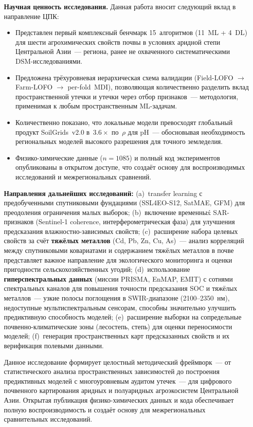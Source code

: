 \textbf{Научная ценность исследования.}
Данная работа вносит следующий вклад в направление ЦПК:
\begin{itemize}[nosep]
  \item Представлен первый комплексный бенчмарк 15~алгоритмов (11~ML + 4~DL) для шести агрохимических свойств почвы в условиях аридной степи Центральной Азии~--- региона, ранее не охваченного систематическими DSM-исследованиями.
  \item Предложена трёхуровневая иерархическая схема валидации (Field-LOFO $\to$ Farm-LOFO $\to$ per-fold~MDI), позволяющая количественно разделить вклад пространственной утечки и утечки через отбор признаков~--- методология, применимая к любым пространственным ML-задачам.
  \item Количественно показано, что локальные модели превосходят глобальный продукт SoilGrids~v2.0 в~$3.6\times$ по~$\rho$ для pH~--- обосновывая необходимость региональных моделей высокого разрешения для точного земледелия.
  \item Физико-химические данные ($n = 1085$) и полный код экспериментов опубликованы в открытом доступе, что создаёт основу для воспроизводимых исследований и межрегиональных сравнений.
\end{itemize}

\textbf{Направления дальнейших исследований:}
(a)~transfer learning с предобученными спутниковыми фундациями (SSL4EO-S12, SatMAE, GFM) для преодоления ограничения малых выборок;
(b)~включение временны\'{x} SAR-признаков (Sentinel-1 coherence, интерферометрическая фаза) для улучшения предсказания влажностно-зависимых свойств;
(c)~расширение набора целевых свойств за счёт \textbf{тяжёлых металлов} (Cd, Pb, Zn, Cu, As)~--- анализ корреляций между спутниковыми ковариатами и содержанием тяжёлых металлов в почве представляет важное направление для экологического мониторинга и оценки пригодности сельскохозяйственных угодий;
(d)~использование \textbf{гиперспектральных данных} (миссии PRISMA, EnMAP, EMIT) с сотнями спектральных каналов для повышения точности предсказания SOC и тяжёлых металлов~--- узкие полосы поглощения в SWIR-диапазоне (2100--2350~нм), недоступные мультиспектральным сенсорам, способны значительно улучшить предиктивную способность моделей;
(e)~расширение выборки на сопредельные почвенно-климатические зоны (лесостепь, степь) для оценки переносимости моделей;
(f)~генерация пространственных карт предсказанных свойств и их верификация полевыми данными.

\medskip
\noindent Данное исследование формирует целостный методический фреймворк~--- от статистического анализа пространственных зависимостей до построения предиктивных моделей с многоуровневым аудитом утечек~--- для цифрового почвенного картирования аридных и полуаридных агроэкосистем Центральной Азии. Открытая публикация физико-химических данных и кода обеспечивает полную воспроизводимость и создаёт основу для межрегиональных сравнительных исследований.


